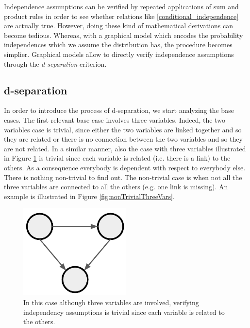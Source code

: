 Independence assumptions can be verified by repeated applications of sum and product rules in order to see whether relations like \ref{conditional_independence} are actually true. However, doing these kind of mathematical derivations can become tedious. Whereas, with a graphical model which encodes the probability independences which we assume the distribution has, the procedure becomes simplier. Graphical models allow to directly verify independence assumptions through the \textit{d-separation} criterion.

\subsection{d-separation}
In order to introduce the process of d-separation, we start analyzing the base cases. The first relevant base case involves three variables. Indeed, the two variables case is trivial, since either the two variables are linked together and so they are related or there is no connection between the two variables and so they are not related. In a similar manner, also the case with three variables illustrated in Figure \ref{fig:trivialDSeparationThreeVariable} is trivial since each variable is related (i.e. there is a link) to the others. As a consequence everybody is dependent with respect to everybody else. There is nothing non-trivial to find out. The non-trivial case is when not all the three variables are connected to all the others (e.g. one link is missing). An example is illustrated in Figure \ref{fig:nonTrivialThreeVars}.

\begin{figure}
    \centering
    \includegraphics[width=0.5\textwidth]{images/exmpleTrivialThreeVariables.png}
    \caption{In this case although three variables are involved, verifying independency assumptions is trivial since each variable is related to the others.}
    \label{fig:trivialDSeparationThreeVariable}
\end{figure}

